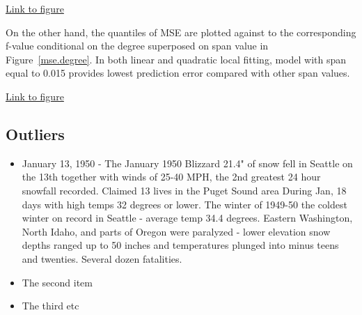 \begin{framed}
\begin{center}
  \href{../plots/a1950/spafit/QuanMABSE.a1950.tmax.span.pdf}{Link to figure}
  \label{mse.span}
\end{center}
\end{framed}

On the other hand, the quantiles of MSE are plotted against to the corresponding
f-value conditional on the degree superposed on span value in 
Figure~\href{../plots/a1950/spafit/QuanMABSE.a1950.tmax.degree.pdf}
{\ref*{mse.degree}}. In both linear and quadratic local fitting, model with span
equal to 0.015 provides lowest prediction error compared with other span values.

\begin{framed}
\begin{center}
  \href{../plots/a1950/spafit/QuanMABSE.a1950.tmax.degree.pdf}{Link to figure}
  \label{mse.degree}
\end{center}
\end{framed}

\subsection{Outliers}

\begin{itemize}
  \item January 13, 1950 - The January 1950 Blizzard
  21.4" of snow fell in Seattle on the 13th together with winds of 25-40 MPH, the 
  2nd greatest 24 hour snowfall recorded. Claimed 13 lives in the Puget Sound area
  During Jan, 18 days with high temps 32 degrees or lower.
  The winter of 1949-50 the coldest winter on record in Seattle - average temp 
  34.4 degrees. Eastern Washington, North Idaho, and parts of Oregon were 
  paralyzed - lower elevation snow depths ranged up to 50 inches and temperatures
  plunged into minus teens and twenties. Several dozen fatalities.
  \item The second item
  \item The third etc
\end{itemize}





